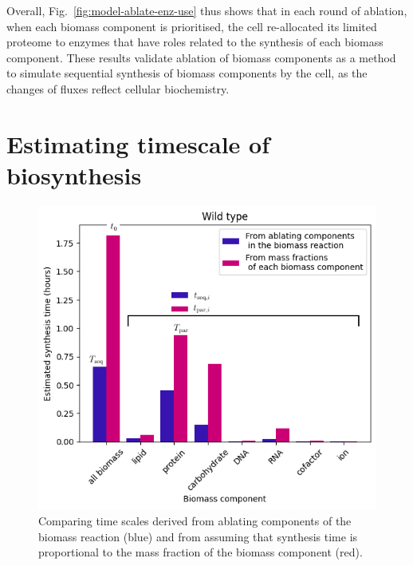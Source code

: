 Overall, Fig.\ \ref{fig:model-ablate-enz-use} thus shows that in each round of ablation, when each biomass component is prioritised, the cell re-allocated its limited proteome to enzymes that have roles related to the synthesis of each biomass component.
These results validate ablation of biomass components as a method to simulate sequential synthesis of biomass components by the cell, as the changes of fluxes reflect cellular biochemistry.


\section{Estimating timescale of biosynthesis}
\label{sec:model-timescale}

\begin{figure}
  \centering
  \includegraphics[width=.9\linewidth]{ablation_example_adapted.png}
  \caption{
    Comparing time scales derived from ablating components of the biomass reaction (blue) and from assuming that synthesis time is proportional to the mass fraction of the biomass component (red).
  }
  \label{fig:model-ablate-times}
\end{figure}



